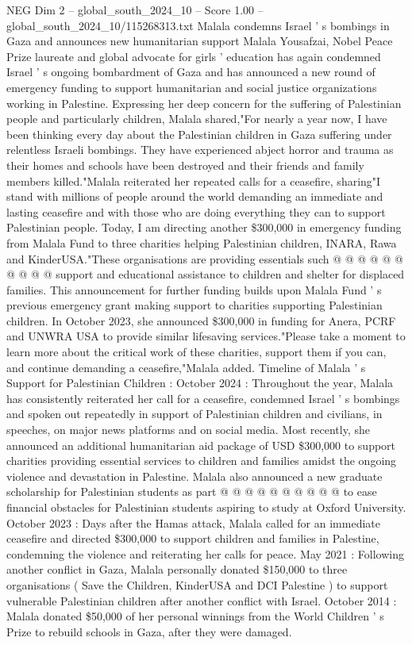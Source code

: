 \begin{textsample}{NEG Dim 2 – global\_south\_2024\_10 – Score 1.00 – global\_south\_2024\_10/115268313.txt}  \label{ex:f2_neg_415}
Malala condemns Israel ' s bombings in Gaza and announces new humanitarian support Malala Yousafzai, Nobel Peace Prize laureate and global advocate for girls ' education has again condemned Israel ' s ongoing bombardment of Gaza and has announced a new round of emergency funding to support humanitarian and social justice organizations working in Palestine.
Expressing her deep concern for the suffering of Palestinian people and particularly children, Malala shared,"For nearly a year now, I have been thinking every day about the Palestinian children in Gaza suffering under relentless Israeli bombings.
They have experienced abject horror and trauma as their homes and schools have been destroyed and their friends and family members killed."Malala reiterated her repeated calls for a ceasefire, sharing"I stand with millions of people around the world demanding an immediate and lasting ceasefire and with those who are doing everything they can to support Palestinian people.
Today, I am directing another \$300,000 in emergency funding from Malala Fund to three charities helping Palestinian children, INARA, Rawa and KinderUSA."These organisations are providing essentials such @ @ @ @ @ @ @ @ @ @ support and educational assistance to children and shelter for displaced families.
This announcement for further funding builds upon Malala Fund ' s previous emergency grant making support to charities supporting Palestinian children.
In October 2023, she announced \$300,000 in funding for Anera, PCRF and UNWRA USA to provide similar lifesaving services."Please take a moment to learn more about the critical work of these charities, support them if you can, and continue demanding a ceasefire,"Malala added.
Timeline of Malala ' s Support for Palestinian Children : October 2024 : Throughout the year, Malala has consistently reiterated her call for a ceasefire, condemned Israel ' s bombings and spoken out repeatedly in support of Palestinian children and civilians, in speeches, on major news platforms and on social media.
Most recently, she announced an additional humanitarian aid package of USD \$300,000 to support charities providing essential services to children and families amidst the ongoing violence and devastation in Palestine.
Malala also announced a new graduate scholarship for Palestinian students as part @ @ @ @ @ @ @ @ @ @ to ease financial obstacles for Palestinian students aspiring to study at Oxford University.
October 2023 : Days after the Hamas attack, Malala called for an immediate ceasefire and directed \$300,000 to support children and families in Palestine, condemning the violence and reiterating her calls for peace.
May 2021 : Following another conflict in Gaza, Malala personally donated \$150,000 to three organisations ( Save the Children, KinderUSA and DCI Palestine ) to support vulnerable Palestinian children after another conflict with Israel.
October 2014 : Malala donated \$50,000 of her personal winnings from the World Children ' s Prize to rebuild schools in Gaza, after they were damaged.

\end{textsample}
